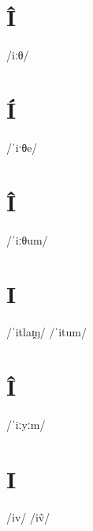 \documentclass[10pt,a4paper,twoside]{book}
\begin{document}
\section*{Î}

\begin{multicols}{3}
 {/iːθ/} {}
\end{multicols}

\section*{Í}

\begin{multicols}{3}
 {/ˈiˑθe/} {}
\end{multicols}

\section*{Î}

\begin{multicols}{3}
 {/ˈiːθum/} {}
\end{multicols}

\section*{I}

\begin{multicols}{3}
 {/ˈitlaɪ̯ŋ/} {}
 {/ˈitum/} {}
\end{multicols}

\section*{Î}

\begin{multicols}{3}
 {/ˈiːyːm/} {}
\end{multicols}

\section*{I}

\begin{multicols}{3}
 {/iv/} {}
 {/iṽ/} {}
\end{multicols}
\end{document}

